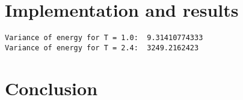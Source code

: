 \documentclass[10pt,a4paper]{article}
\begin{document}
\section{Implementation and results}

\begin{lstlisting}
Variance of energy for T = 1.0:  9.31410774333
Variance of energy for T = 2.4:  3249.2162423
\end{lstlisting}


\section{Conclusion}



\printbibliography %
\end{document}
